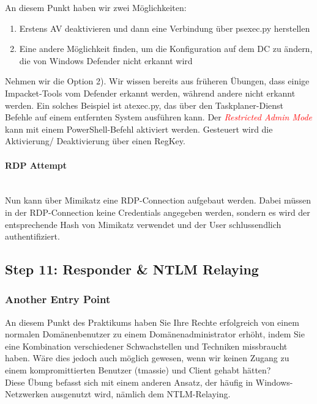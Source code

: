 An diesem Punkt haben wir zwei Möglichkeiten:\\
\begin{enumerate}
    \item Erstens AV deaktivieren und dann eine Verbindung über psexec.py herstellen
    \item Eine andere Möglichkeit finden, um die Konfiguration auf dem DC zu ändern, die von Windows Defender nicht erkannt wird\\
\end{enumerate}

Nehmen wir die Option 2). Wir wissen bereits aus früheren Übungen, dass einige Impacket-Tools vom Defender erkannt werden, während andere nicht erkannt werden. Ein solches Beispiel ist atexec.py, das über den Taskplaner-Dienst Befehle auf einem entfernten System ausführen kann.
Der \textcolor{red}{\textit{Restricted Admin Mode}} kann mit einem PowerShell-Befehl aktiviert werden. Gesteuert wird die Aktivierung/ Deaktivierung über einen RegKey.

\paragraph{RDP Attempt}\mbox{} \\
Nun kann über Mimikatz eine RDP-Connection aufgebaut werden. Dabei müssen in der RDP-Connection keine Credentials angegeben werden, sondern es wird der entsprechende Hash von Mimikatz verwendet und der User schlussendlich authentifiziert.



\subsection{Step 11: Responder \& NTLM Relaying}

\subsubsection{Another Entry Point}
An diesem Punkt des Praktikums haben Sie Ihre Rechte erfolgreich von einem normalen Domänenbenutzer zu einem Domänenadministrator erhöht, indem Sie eine Kombination verschiedener Schwachstellen und Techniken missbraucht haben. Wäre dies jedoch auch möglich gewesen, wenn wir keinen Zugang zu einem kompromittierten Benutzer (tmassie) und Client gehabt hätten?\\

Diese Übung befasst sich mit einem anderen Ansatz, der häufig in Windows-Netzwerken ausgenutzt wird, nämlich dem NTLM-Relaying.\\

